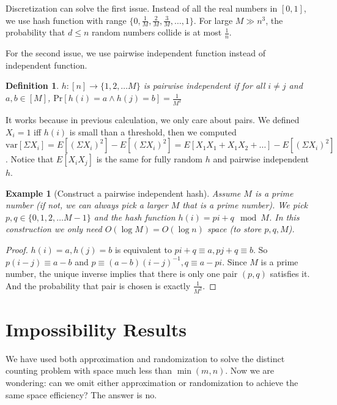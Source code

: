 \documentclass[11pt]{article}
\newtheorem{example}[theorem]{Example}
\newtheorem{definition}[theorem]{Definition}
\begin{document}
Discretization can solve the first issue. Instead of all the real numbers in $[0, 1]$, we use hash function with range $\{0, \frac{1}{M}, \frac{2}{M}, \frac{3}{M}, \ldots, 1\}$. For large $M \gg n^{3}$, the probability that $d \le n$ random numbers collide is at most $\frac{1}{n}$.

For the second issue, we use pairwise independent function instead of independent function.

\begin{definition}
$h: [n] \rightarrow \{1, 2, \ldots M\}$ is pairwise independent if for all $i \ne j$ and $a, b \in [M]$, $\text{Pr}[h(i)=a \land h(j)=b]=\frac{1}{M^2}$
\end{definition}

It works because in previous calculation, we only care about pairs. We defined $X_i=1$ iff $h(i)$ is small than a threshold, then we computed $\text{var}[\Sigma X_i] = E[(\Sigma X_i)^2] - E[(\Sigma X_i)^2] = E[X_1X_1 + X_1X_2 + \ldots]- E[(\Sigma X_i)^2]$. Notice that $E[X_iX_j]$ is the same for fully random $h$ and pairwise independent $h$.

\begin{example}
[Construct a pairwise independent hash]
Assume $M$ is a prime number (if not, we can always pick a larger $M$ that is a prime number). We pick $p, q \in \{0, 1, 2, \ldots M-1 \}$ and the hash function $h(i) = pi+q \mod M$. In this construction we only need $O(\log M) = O(\log n)$ space (to store $p, q, M$).
\end{example}

\begin{proof}
$h(i)=a, h(j)=b$ is equivalent to $pi+q \equiv a, pj+q \equiv b$. So $p(i-j) \equiv a-b$ and $p \equiv (a-b)(i-j)^{-1}, q \equiv a - pi$. Since $M$ is a prime number, the unique inverse implies that there is only one pair $(p, q)$ satisfies it. And the probability that pair is chosen is exactly $\frac{1}{M^2}$.
\end{proof}

\section{Impossibility Results}

We have used both approximation and randomization to solve the distinct counting problem with space much less than $\min{(m, n)}$. Now we are wondering: can we omit either approximation or randomization to achieve the same space efficiency? The answer is no.
\end{document}
